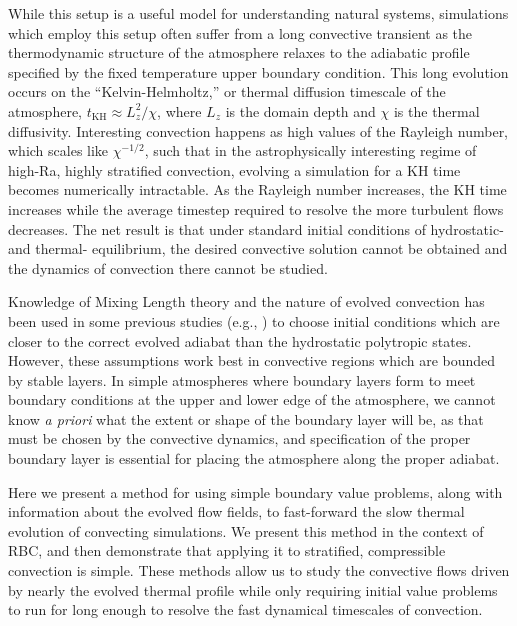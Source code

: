 \documentclass[aps, pre, onecolumn, nofootinbib, notitlepage, groupedaddress, amsfonts, amssymb, amsmath, longbibliography]{revtex4-1}
\begin{document}
While this setup is a useful model for understanding natural
systems, simulations which employ this setup often suffer from a long convective transient as the thermodynamic structure
of the atmosphere relaxes to the adiabatic profile specified by the fixed temperature upper boundary condition.
This long evolution occurs on the ``Kelvin-Helmholtz,'' or thermal diffusion timescale of the atmosphere, 
$t_{\text{KH}} \approx L_z^2 / \chi$, where $L_z$ is the domain depth and $\chi$ is the thermal diffusivity.
Interesting convection happens as high values of the Rayleigh number, which scales like $\chi^{-1/2}$, such that
in the astrophysically interesting regime of high-Ra, highly stratified convection, evolving a simulation for a
KH time becomes numerically intractable.  As the Rayleigh number increases, the KH time increases while the average
timestep required to resolve the more turbulent flows decreases.  The net result is that under standard initial conditions
of hydrostatic- and thermal- equilibrium, the desired convective solution cannot be obtained and the dynamics of convection
there cannot be studied.

Knowledge of Mixing Length theory and the nature of evolved convection has been used in some 
previous studies (e.g., \cite{brandenburg&all2005}) to choose initial conditions which are
closer to the correct evolved adiabat than
the hydrostatic polytropic states.  However, these assumptions work best in convective regions
which are bounded by stable layers.  In simple atmospheres where boundary layers form to meet
boundary conditions at the upper and lower edge of the atmosphere, we cannot know 
\emph{a priori} what the extent or shape of the boundary layer will be, as that must be chosen
by the convective dynamics, and specification of the proper boundary layer is essential for
placing the atmosphere along the proper adiabat.

Here we present a method for using simple boundary value problems, 
along with information about the evolved flow fields,
to fast-forward the slow thermal evolution of convecting simulations.  
We present this method in the context of RBC, and
then demonstrate that applying it to stratified, compressible convection 
is simple.  These methods allow us to study the convective flows driven by 
nearly the evolved thermal profile while only requiring initial value problems to run
for long enough to resolve the fast dynamical timescales of convection.
\end{document}
